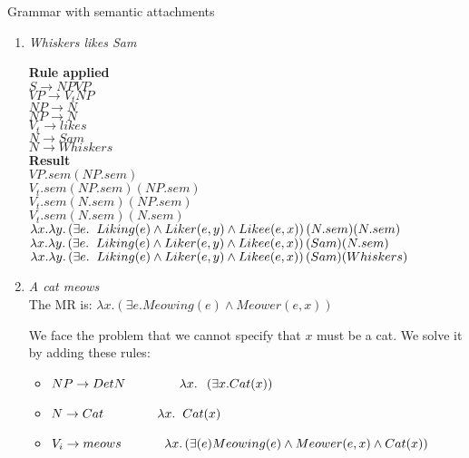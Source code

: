 \documentclass[12pt]{article}
\newcommand{\lp}{\left(}
\newcommand{\rp}{\right)}
\newenvironment{exercise}[2][Exercise]{\begin{trivlist}
\item[\hskip \labelsep {\bfseries #1}\hskip \labelsep {\bfseries #2.}]}{\end{trivlist}}
\begin{document}
\begin{exercise}{5} Grammar with semantic attachments

\begin{enumerate}[label=(\alph*)]
\item \textit{Whiskers likes Sam}

\begin{vwcol}[widths={0.25,1.2}]
\textbf{Rule applied} \\
$S \rightarrow NP VP$\\
$VP \rightarrow V_t NP$\\
$NP \rightarrow N$ \\ 
$NP \rightarrow N$ \\ 
$V_t \rightarrow likes$ \\ 
$N \rightarrow Sam$ \\ 
$N \rightarrow Whiskers$ \\
\textbf{Result} \\
$VP.sem(NP.sem)$ \\
$V_t.sem(NP.sem)(NP.sem)$ \\
$V_t.sem(N.sem)(NP.sem)$ \\
$V_t.sem(N.sem)(N.sem)$ \\
$\lambda x. \lambda y. \lp \exists e. \hspace{0.2cm} Liking(e) \land Liker(e, y) \land Likee(e, x)\rp (N.sem)(N.sem)$ \\
$\lambda x. \lambda y. \lp \exists e. \hspace{0.2cm} Liking(e) \land Liker(e, y) \land Likee(e, x)\rp (Sam)(N.sem)$ \\
$\lambda x. \lambda y. \lp \exists e. \hspace{0.2cm} Liking(e) \land Liker(e, y) \land Likee(e, x)\rp (Sam)(Whiskers)$ \\
\end{vwcol}

\item \textit{A cat meows} \\
The MR is: $\lambda x.\lp \exists e. Meowing(e) \land Meower(e, x) \rp$ 

We face the problem that we cannot specify that $x$ must be a cat. We solve it by adding these rules:

\begin{itemize}
\item $NP \rightarrow Det N \hspace{1.5cm} \lambda x. \hspace{0.2cm} \lp \exists x. Cat(x) \rp$ %
\item $N \rightarrow Cat \hspace{1.5cm} \lambda x. \hspace{0.2cm} Cat(x)$
\item $V_i \rightarrow meows \hspace{1.2cm} \lambda x. \lp \exists(e) Meowing(e) \land Meower(e,x) \land Cat(x) \rp$ \\
\end{itemize}


\end{enumerate}
\end{exercise}
\end{document}
